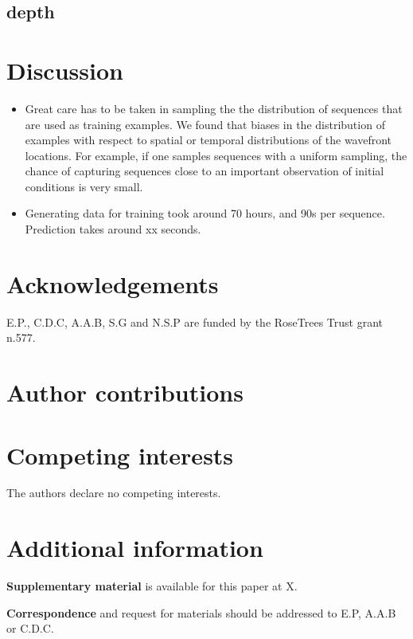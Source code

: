 \documentclass{article}
\begin{document}
    \subsection{depth}
    \section{Discussion}
    \begin{itemize}
        \item Great care has to be taken in sampling the the distribution of sequences that are used as training examples. We found that biases in the distribution of examples with respect to spatial or temporal distributions of the wavefront locations. For example, if one samples sequences with a uniform sampling, the chance of capturing sequences close to an important observation of initial conditions is very small.
        \item Generating data for training took around 70 hours, and 90s per sequence. Prediction takes around xx seconds.
    \end{itemize}
    
    
    
    \section{Acknowledgements}
    E.P., C.D.C, A.A.B, S.G and N.S.P are funded by the RoseTrees Trust grant n.577.
    
    \section{Author contributions}
    
    \section{Competing interests}
    The authors declare no competing interests.
    
    \section{Additional information}\label{sup}
        \textbf{Supplementary material} is available for this paper at X.
        
        \textbf{Correspondence} and request for materials should be addressed to E.P, A.A.B or C.D.C. %
    
\end{document}
